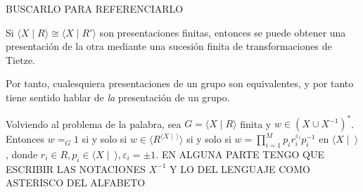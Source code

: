 \documentclass[bibtex, anon]{TEMat-article}
\providecommand{\gene}[1]{\langle{#1}\rangle}
\begin{document}
BUSCARLO PARA REFERENCIARLO
\begin{teorema}
	Si $\gene{X\mid R}\cong\gene{X\mid R'}$ son presentaciones finitas, entonces se puede obtener una presentación de la otra mediante una sucesión finita de transformaciones de Tietze.
\end{teorema}

Por tanto, cualesquiera presentaciones de un grupo son equivalentes, y por tanto tiene sentido hablar de \emph{la} presentación de un grupo. 

Volviendo al problema de la palabra, sea $G=\gene{X\mid R}$ finita y $w\in (X\cup X^{-1})^*$. Entonces $w=_G 1$ si y solo si $w\in \gene{R^{\gene{X\mid\ }}}$ si y solo si $w=\displaystyle\prod_{i=1}^M p_ir_i^{\varepsilon_i}p_i^{-1}$ en $\gene{X\mid\ }$, donde $r_i\in R, p_i\in\gene{X\mid\ }, \varepsilon_i=\pm 1$. EN ALGUNA PARTE TENGO QUE ESCRIBIR LAS NOTACIONES $X^{-1}$ Y LO DEL LENGUAJE COMO ASTERISCO DEL ALFABETO
\end{document}
